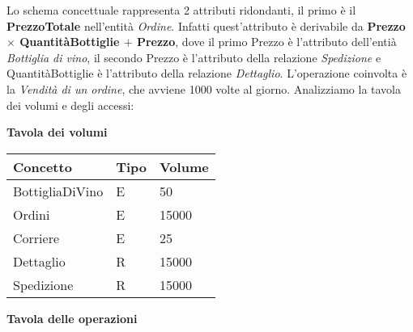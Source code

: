 Lo schema concettuale rappresenta 2 attributi ridondanti, il primo è il \textbf{PrezzoTotale} nell'entità \emph{Ordine}. Infatti quest'attributo è derivabile da \textbf{Prezzo $\times$ QuantitàBottiglie $+$ Prezzo}, dove il primo Prezzo è l'attributo dell'entià \emph{Bottiglia di vino}, il secondo Prezzo è l'attributo della relazione \emph{Spedizione} e QuantitàBottiglie è l'attributo della relazione \emph{Dettaglio}. L'operazione coinvolta è la \emph{Vendità di un ordine}, che avviene 1000 volte al giorno. Analizziamo la tavola dei volumi e degli accessi:

\begin{center}
	\textbf{\large{Tavola dei volumi}}\\
	\begin{tabular}{P{2cm}P{8cm}P{4cm}}
		\toprule
		 Concetto & Tipo & Volume \\
		\midrule
		BottigliaDiVino & E & 50\\
		\midrule
		Ordini & E & 15000\\
		\midrule
		Corriere & E & 25\\
		\midrule
		Dettaglio & R & 15000\\
		\midrule
		Spedizione & R & 15000\\
		\bottomrule
	\end{tabular}


	\textbf{\large{Tavola delle operazioni}}\\
	


\end{center}
